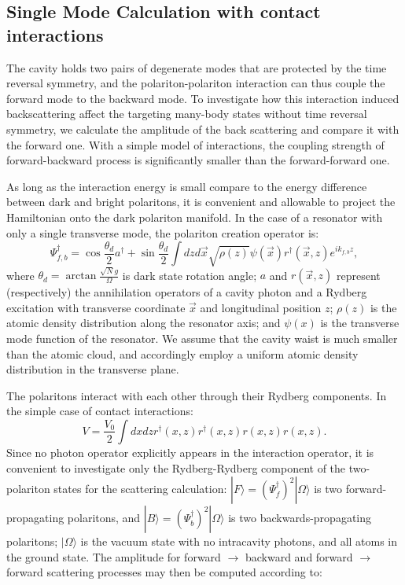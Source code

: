 \documentclass[aps,pra,twocolumn,groupedaddress,10pt,showpacs]{revtex4-1}
\begin{document}
\subsection{Single Mode Calculation with contact interactions}
\label{App:MatrixEle}
The cavity holds two pairs of degenerate modes that are protected by the time reversal symmetry, and the polariton-polariton interaction can thus couple the forward mode to the backward mode. To investigate how this interaction induced backscattering affect the targeting many-body states without time reversal symmetry, we calculate the amplitude of the back scattering and compare it with the forward one. With a simple model of interactions, the coupling strength of forward-backward process is significantly smaller than the forward-forward one.

As long as the interaction energy is small compare to the energy difference between dark and bright polaritons, it is convenient and allowable to project the Hamiltonian onto the dark polariton manifold. In the case of a resonator with only a single transverse mode, the polariton creation operator is:
\begin{equation}
\Psi_{f,b}^\dagger =  \cos{\frac{\theta_d}{2}} a^\dagger + \sin{\frac{\theta_d}{2}} \int dz d\vec{x} \sqrt{\rho(z)} \psi(\vec{x}) r^\dagger(\vec{x},z) e^{i k_{f,b} z},
\end{equation}
where $\theta_d=\arctan{\frac{\sqrt{N}g}{\Omega}}$ is dark state rotation angle; $a$ and $r(\vec{x},z)$ represent (respectively) the annihilation operators of a cavity photon and a Rydberg excitation with transverse coordinate $\vec{x}$ and longitudinal position $z$; $\rho(z)$ is the atomic density distribution along the resonator axis; and $\psi(x)$ is the transverse mode function of the resonator. We assume that the cavity waist is much smaller than the atomic cloud, and accordingly employ a uniform atomic density distribution in the transverse plane.

The polaritons interact with each other through their Rydberg components. In the simple case of contact interactions:
\begin{equation}
V = \frac{V_{0}}{2} \int dx dz r^{\dagger}(x,z) r^{\dagger}(x,z) r(x,z) r(x,z).
\end{equation}
Since no photon operator explicitly appears in the interaction operator, it is convenient to investigate only the Rydberg-Rydberg component of the two-polariton states for the scattering calculation: $|F\rangle=(\Psi_f^\dagger)^2|\Omega\rangle$ is two forward-propagating polaritons, and $|B\rangle=(\Psi_b^\dagger)^2|\Omega\rangle$ is two backwards-propagating polaritons; $|\Omega\rangle$ is the vacuum state with no intracavity photons, and all atoms in the ground state. The amplitude for forward $\rightarrow$ backward and forward $\rightarrow$ forward scattering processes may then be computed according to:
\end{document}
